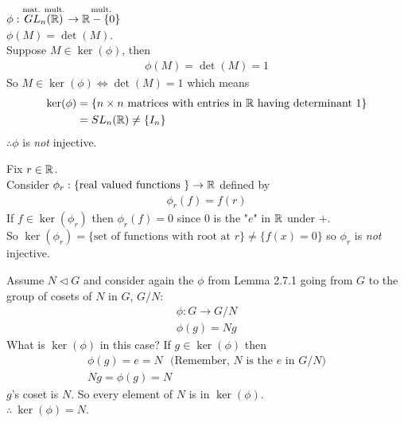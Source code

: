 \begin{example}
$\phi:\overset{\text{mat. mult.}}{GL_n({\mathbb{R}})}\rightarrow \overset{\text{mult.}}{{\mathbb{R}}-\{0\}}$ \\
$\phi(M)=\det(M)$. \\
Suppose $M\in \ker(\phi)$, then
\begin{align}
    \phi(M)=\det(M)=1 \nonumber
\end{align}
So $M\in \ker(\phi) \iff \det(M)=1$ which means
\begin{align}
    \text{ker}(\phi)&=\{n\times n \text{ matrices with entries in }{\mathbb{R}} \text{ having determinant }1\}\nonumber \\
    &=SL_n({\mathbb{R}}) \neq \{I_n\} \nonumber
\end{align}
$\therefore \phi$ is \textit{not} injective.
\end{example}

\begin{example}
Fix $r\in {\mathbb{R}}$. \\
Consider $\phi_r: \{\text{real valued functions }\}\rightarrow {\mathbb{R}}$ defined by
\begin{align}
    \phi_r(f)=f(r)\nonumber
\end{align}
If $f\in \ker(\phi_r)$ then $\phi_r(f)=0$ since $0$ is the "$e$" in ${\mathbb{R}}$ under $+$. \\
So $\ker(\phi_r) = \{\text{set of functions with root at } r\} \neq \{f(x)=0\}$ so $\phi_r$ is
\textit{not} injective.
\end{example}

\begin{example}
Assume $N\triangleleft G$ and consider again the $\phi$ from Lemma 2.7.1 going from $G$ to the group
of cosets of $N$ in $G$, $G/N$:
\begin{align}
    \phi: G\rightarrow G/N \nonumber \\
    \phi(g)= Ng \nonumber
\end{align}
What is $\ker(\phi)$ in this case? If $g\in \ker(\phi)$ then
\begin{align}
    \phi(g)=e= N \ \ \ \text{(Remember, $N$ is the $e$ in $G/N$)}\nonumber \\
    Ng=\phi(g)=N \nonumber
\end{align}
$g$'s coset is $N$. So every element of $N$ is in $\ker(\phi)$.\\
$\therefore \ \ker(\phi)=N$.
\end{example}

